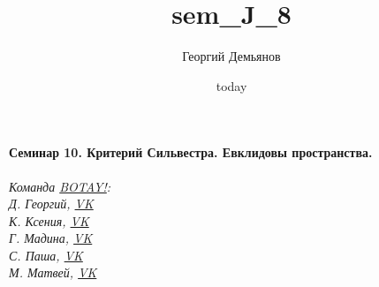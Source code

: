 \documentclass[a4paper,12pt]{article}
\title{sem_J_8}
\author{Георгий Демьянов}
\date{today}
\begin{document}
\paragraph{{\LARGE Семинар 10. Критерий Сильвестра. Евклидовы пространства.}\\}


%
%
%










\begin{center}
	\vfill \emph{{\small Команда \href{https://vk.com/botay_fizteh}{BOTAY!}:\\
			Д. Георгий, \href{https://vk.com/id37346992}{VK}\\
			К. Ксения, \href{https://vk.com/id143862366}{VK}\\
			Г. Мадина, \href{https://vk.com/id226312463}{VK}\\
			С. Паша, \href{https://vk.com/id181006282}{VK}\\
			М. Матвей, \href{https://vk.com/id62009425}{VK}\\
	}}
\end{center}
\end{document}
